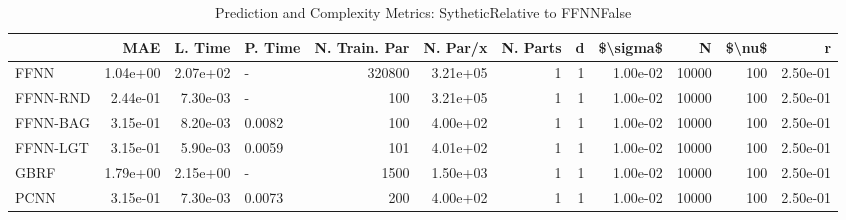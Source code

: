 \begin{table}
\centering
\caption{Prediction and Complexity Metrics: SytheticRelative to FFNNFalse}
\label{tab__Sythetic__Fix_Neurons_QTrue}
\begin{tabular}{lrrlrrrrrrrr}
\toprule
{} &      MAE &  L. Time & P. Time &  N. Train. Par &  N. Par/x &  N. Parts &  d &  \$\textbackslash sigma\$ &      N &  \$\textbackslash nu\$ &        r \\
\midrule
FFNN     & 1.04e+00 & 2.07e+02 &       - &         320800 &  3.21e+05 &         1 &  1 &  1.00e-02 &  10000 &    100 & 2.50e-01 \\
FFNN-RND & 2.44e-01 & 7.30e-03 &       - &            100 &  3.21e+05 &         1 &  1 &  1.00e-02 &  10000 &    100 & 2.50e-01 \\
FFNN-BAG & 3.15e-01 & 8.20e-03 &  0.0082 &            100 &  4.00e+02 &         1 &  1 &  1.00e-02 &  10000 &    100 & 2.50e-01 \\
FFNN-LGT & 3.15e-01 & 5.90e-03 &  0.0059 &            101 &  4.01e+02 &         1 &  1 &  1.00e-02 &  10000 &    100 & 2.50e-01 \\
GBRF     & 1.79e+00 & 2.15e+00 &       - &           1500 &  1.50e+03 &         1 &  1 &  1.00e-02 &  10000 &    100 & 2.50e-01 \\
PCNN     & 3.15e-01 & 7.30e-03 &  0.0073 &            200 &  4.00e+02 &         1 &  1 &  1.00e-02 &  10000 &    100 & 2.50e-01 \\
\bottomrule
\end{tabular}
\end{table}
